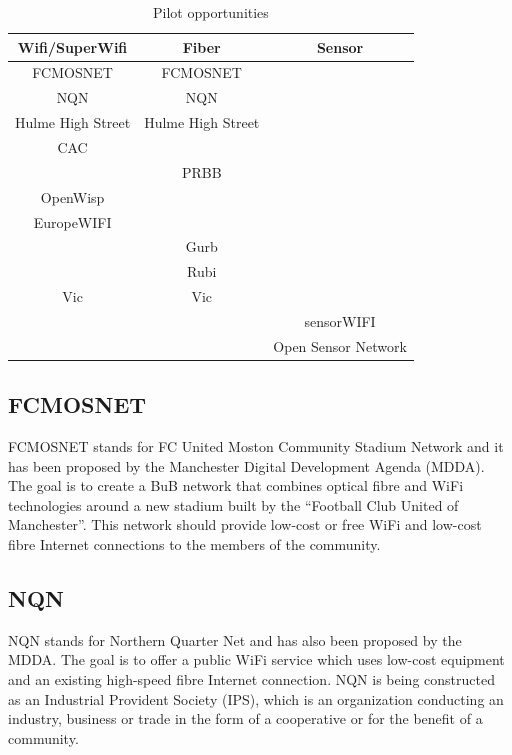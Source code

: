 \documentclass[conference]{IEEEtran}
\begin{document}
\begin{table}[!t]
\renewcommand{\arraystretch}{1.3}
\caption{Pilot opportunities}
\label{tab:pilot_opportunities}
\centering
\begin{tabular}{|c||c||c|}
\hline
Wifi/SuperWifi & Fiber & Sensor\\
\hline
FCMOSNET & FCMOSNET & \\
NQN & NQN & \\
Hulme High Street & Hulme High Street & \\
CAC & & \\
& PRBB & \\
OpenWisp& & \\
EuropeWIFI& & \\
& Gurb & \\
& Rubi & \\
Vic & Vic & \\
& & sensorWIFI\\
& & Open Sensor Network\\
\hline
\end{tabular}
\end{table}


\subsection{FCMOSNET}
FCMOSNET stands for FC United Moston Community Stadium Network and it has been proposed by the Manchester Digital Development Agenda (MDDA).
The goal is to create a BuB network that combines optical fibre and WiFi technologies around a new stadium built by the ``Football Club United of Manchester''.
This network should provide low-cost or free WiFi and low-cost fibre Internet connections to the members of the community.

\subsection{NQN}
NQN stands for Northern Quarter Net and has also been proposed by the MDDA.
The goal is to offer a public WiFi service which uses low-cost equipment and an existing high-speed fibre Internet connection.
NQN is being constructed as an Industrial Provident Society (IPS), which is an organization conducting an industry, business or trade in the form of a cooperative or for the benefit of a community.
\end{document}
